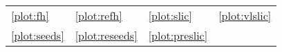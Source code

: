 	{\scriptsize
		\begin{tabularx}{0.475\textwidth}{X X X l}
			\ref{plot:fh} \FH &
			\ref{plot:refh} \reFH &
			\ref{plot:slic} \SLIC &
			\ref{plot:vlslic} \vlSLIC\\
			\ref{plot:seeds} \SEEDS &
			\ref{plot:reseeds} \reSEEDS &
			\ref{plot:preslic} \preSLIC
		\end{tabularx}
	}
